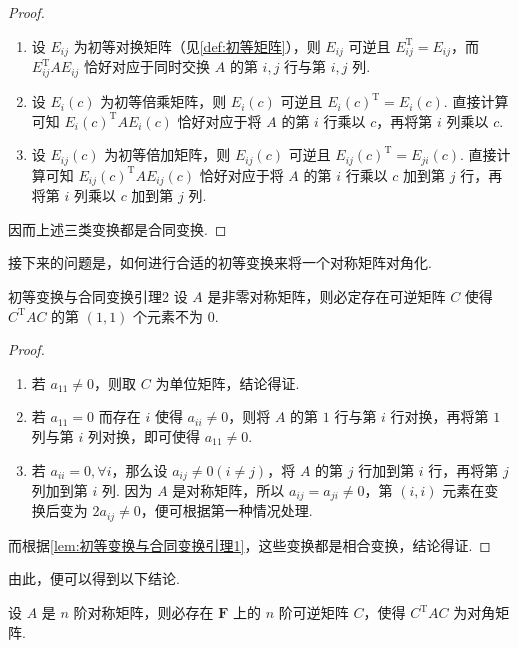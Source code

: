 \begin{proof}
    \begin{enumerate}
        \item 设 $E_{ij}$ 为初等对换矩阵（见\autoref{def:初等矩阵}），则 $E_{ij}$ 可逆且 $E_{ij}^\mathrm{T} = E_{ij}$，而 $E_{ij}^\mathrm{T}AE_{ij}$ 恰好对应于同时交换 $A$ 的第 $i,j$ 行与第 $i,j$ 列.

        \item 设 $E_i(c)$ 为初等倍乘矩阵，则 $E_i(c)$ 可逆且 $E_i(c)^\mathrm{T}=E_i(c)$. 直接计算可知 $E_i(c)^\mathrm{T}AE_i(c)$ 恰好对应于将 $A$ 的第 $i$ 行乘以 $c$，再将第 $i$ 列乘以 $c$.

        \item 设 $E_{ij}(c)$ 为初等倍加矩阵，则 $E_{ij}(c)$ 可逆且 $E_{ij}(c)^\mathrm{T}=E_{ji}(c)$. 直接计算可知 $E_{ij}(c)^\mathrm{T}AE_{ij}(c)$ 恰好对应于将 $A$ 的第 $i$ 行乘以 $c$ 加到第 $j$ 行，再将第 $i$ 列乘以 $c$ 加到第 $j$ 列.
    \end{enumerate}
    因而上述三类变换都是合同变换.
\end{proof}

接下来的问题是，如何进行合适的初等变换来将一个对称矩阵对角化.

\begin{lemma}{}{初等变换与合同变换引理2}
    设 $A$ 是非零对称矩阵，则必定存在可逆矩阵 $C$ 使得 $C^\mathrm{T}AC$ 的第 $(1, 1)$ 个元素不为 $0$.
\end{lemma}

\begin{proof}
    \begin{enumerate}
        \item 若 $a_{11} \neq 0$，则取 $C$ 为单位矩阵，结论得证.
        \item 若 $a_{11} = 0$ 而存在 $i$ 使得 $a_{ii} \neq 0$，则将 $A$ 的第 $1$ 行与第 $i$ 行对换，再将第 $1$ 列与第 $i$ 列对换，即可使得 $a_{11} \neq 0$.
        \item 若 $a_{ii} = 0, \forall i$，那么设 $a_{ij} \neq 0(i \neq j)$，将 $A$ 的第 $j$ 行加到第 $i$ 行，再将第 $j$ 列加到第 $i$ 列. 因为 $A$ 是对称矩阵，所以 $a_{ij} = a_{ji} \neq 0$，第 $(i, i)$ 元素在变换后变为 $2 a_{ij} \neq 0$，便可根据第一种情况处理.
    \end{enumerate}
    而根据\autoref{lem:初等变换与合同变换引理1}，这些变换都是相合变换，结论得证.
\end{proof}

由此，便可以得到以下结论.

\begin{theorem}{}{}
    设 $A$ 是 $n$ 阶对称矩阵，则必存在 $\mathbf{F}$ 上的 $n$ 阶可逆矩阵 $C$，使得 $C^\mathrm{T}AC$ 为对角矩阵.
\end{theorem}

